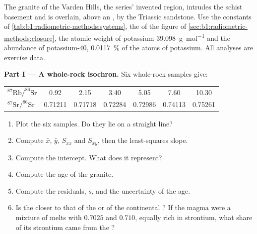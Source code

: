 \begin{problem}
\label{pb:b1:radiometric-methods:1}
The granite of the Varden Hills, the series' invented region, intrudes the
schist basement and is overlain, above an , by the Triassic
sandstone. Use the constants of \cref{tab:b1:radiometric-methods:systems}, the
 of the figure of \cref{sec:b1:radiometric-methods:closure},
the atomic weight of potassium \qty{39.098}{g.mol^{-1}} and the abundance of
potassium-40, \qty{0.0117}{\percent} of the atoms of potassium. All analyses are
exercise data.

\medskip
\noindent\textbf{Part I --- A whole-rock isochron.} Six whole-rock samples give:
\begin{center}
\small
\begin{tabular}{|l|cccccc|}
\hline
$^{87}\mathrm{Rb}/^{86}\mathrm{Sr}$ & 0.92 & 2.15 & 3.40 & 5.05 & 7.60 & 10.30 \\
$^{87}\mathrm{Sr}/^{86}\mathrm{Sr}$ & 0.71211 & 0.71718 & 0.72284 & 0.72986 & 0.74113 & 0.75261 \\
\hline
\end{tabular}
\end{center}
\begin{enumerate}
  \item Plot the six samples. Do they lie on a straight line?
  \item Compute $\bar x$, $\bar y$, $S_{xx}$ and $S_{xy}$, then the
        least-squares slope.
  \item Compute the intercept. What does it represent?
  \item Compute the age of the granite.
  \item Compute the residuals, $s$, and the uncertainty of the age.
  \item Is the  closer to that of the  or of the continental
        ? If the magma were a mixture of melts with $0.7025$ and $0.710$,
        equally rich in strontium, what share of its strontium came from the
        ?
\end{enumerate}


\end{problem}
